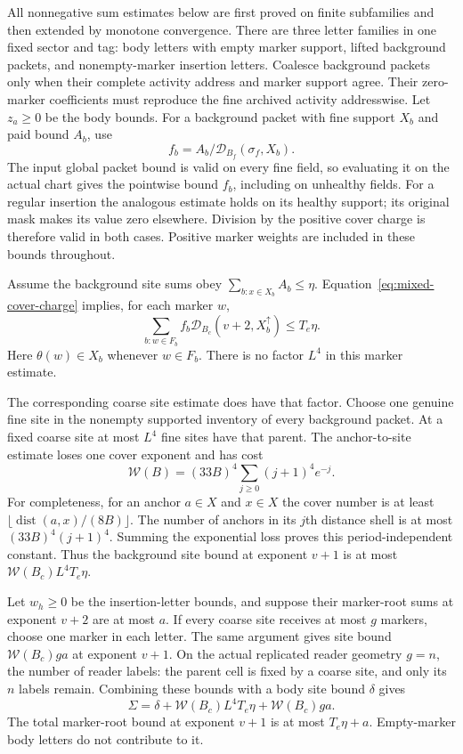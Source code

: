 All nonnegative sum estimates below are first proved on finite
subfamilies and then extended by monotone convergence.
There are three letter families in one fixed sector and tag:
body letters with empty marker support, lifted background packets,
and nonempty-marker insertion letters. Coalesce background packets
only when their complete activity address and marker support agree.
Their zero-marker coefficients must reproduce the fine archived
activity addresswise. Let $z_a\ge0$ be the body bounds. For a
background packet with fine support $X_b$ and paid bound $A_b$, use
\[
       f_b=A_b/\mathcal D_{B_f}(\sigma_f,X_b).
\]
The input global packet bound is valid on every fine field, so evaluating
it on the actual chart gives the pointwise bound $f_b$, including on
unhealthy fields. For a regular insertion the analogous estimate holds
on its healthy support; its original mask makes its value zero elsewhere.
Division by the positive cover charge is therefore valid in both cases.
Positive marker weights are included in these bounds throughout.

Assume the background site sums obey
$\sum_{b:x\in X_b}A_b\le\eta$. Equation~\ref{eq:mixed-cover-charge}
implies, for each marker $w$,
\begin{equation}\label{eq:mixed-background-marker}
 \sum_{b:w\in F_b}f_b\mathcal D_{B_c}(v+2,X_b^\uparrow)
                         \le T_e\eta.
\end{equation}
Here $\theta(w)\in X_b$ whenever $w\in F_b$. There is no factor
$L^4$ in this marker estimate.

The corresponding coarse site estimate does have that factor. Choose
one genuine fine site in the nonempty supported inventory of every
background packet. At a fixed coarse site at most $L^4$ fine sites
have that parent. The anchor-to-site estimate loses one cover exponent
and has cost
\[
 \mathcal W(B)=(33B)^4\sum_{j\ge0}(j+1)^4e^{-j}.
\]
For completeness, for an anchor $a\in X$ and $x\in X$ the cover
number is at least $\lfloor\operatorname{dist}(a,x)/(8B)\rfloor$.
The number of anchors in its $j$th distance shell is at most
$(33B)^4(j+1)^4$. Summing the exponential loss proves this
period-independent constant. Thus the background site bound at
exponent $v+1$ is at most $\mathcal W(B_c)L^4T_e\eta$.

Let $w_h\ge0$ be the insertion-letter bounds, and suppose their
marker-root sums at exponent $v+2$ are at most $a$. If every coarse
site receives at most $g$ markers, choose one marker in each letter.
The same argument gives site bound $\mathcal W(B_c)ga$ at exponent
$v+1$. On the actual replicated reader geometry $g=n$, the number of
reader labels: the parent cell is fixed by a coarse site, and only its
$n$ labels remain. Combining these bounds with a body site bound
$\delta$ gives
\begin{equation}\label{eq:mixed-letter-price}
 \Sigma=\delta+\mathcal W(B_c)L^4T_e\eta
                         +\mathcal W(B_c)ga.
\end{equation}
The total marker-root bound at exponent $v+1$ is at most
$T_e\eta+a$. Empty-marker body letters do not contribute to it.

